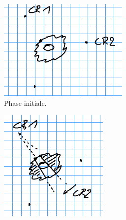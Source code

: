 \documentclass[english,RandD]{rapportPFE}  %
\begin{document}
				\begin{figure}[h!]
					\centering
					\begin{subfigure}[t]{0.3\linewidth}
						\centering
						\includegraphics[width=\linewidth]{graphics/triangle_1.png}
						\caption{Phase initiale.}
						\label{fig:triangle_1}
					\end{subfigure}
					\hfill
					\begin{subfigure}[t]{0.3\linewidth}
						\centering
						\includegraphics[width=\linewidth]{graphics/triangle_2.png}

\end{subfigure}
\end{figure}
\end{document}
